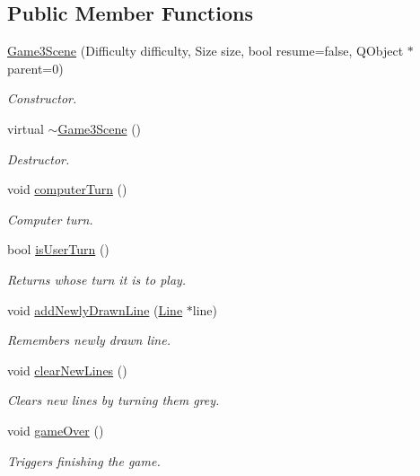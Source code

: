 \subsection*{\-Public \-Member \-Functions}
\begin{DoxyCompactItemize}
\item 
\hyperlink{classGame3Scene_a474f98b788997992aed5f5120414a095}{\-Game3\-Scene} (\-Difficulty difficulty, \-Size size, bool resume=false, \-Q\-Object $\ast$parent=0)
\begin{DoxyCompactList}\small\item\em \-Constructor. \end{DoxyCompactList}\item 
virtual \hyperlink{classGame3Scene_a6a41bfc50cb0f2304ecb7a82c39f615a}{$\sim$\-Game3\-Scene} ()
\begin{DoxyCompactList}\small\item\em \-Destructor. \end{DoxyCompactList}\item 
void \hyperlink{classGame3Scene_a42001b176b1bf8adaac5dbbdf78c944c}{computer\-Turn} ()
\begin{DoxyCompactList}\small\item\em \-Computer turn. \end{DoxyCompactList}\item 
bool \hyperlink{classGame3Scene_a15e0a02a54f5db10129d40bb9d5cd6ed}{is\-User\-Turn} ()
\begin{DoxyCompactList}\small\item\em \-Returns whose turn it is to play. \end{DoxyCompactList}\item 
void \hyperlink{classGame3Scene_a13d2095b46ba4f23f5b747bbbc556890}{add\-Newly\-Drawn\-Line} (\hyperlink{classLine}{\-Line} $\ast$line)
\begin{DoxyCompactList}\small\item\em \-Remembers newly drawn line. \end{DoxyCompactList}\item 
void \hyperlink{classGame3Scene_a8af77b8adc69ae0d2e6dc336674dd2e1}{clear\-New\-Lines} ()
\begin{DoxyCompactList}\small\item\em \-Clears new lines by turning them grey. \end{DoxyCompactList}\item 
void \hyperlink{classGame3Scene_a634df6ad5ac3776bc3d18519214e2eec}{game\-Over} ()
\begin{DoxyCompactList}\small\item\em \-Triggers finishing the game. \end{DoxyCompactList}\item 

\end{DoxyCompactItemize}
